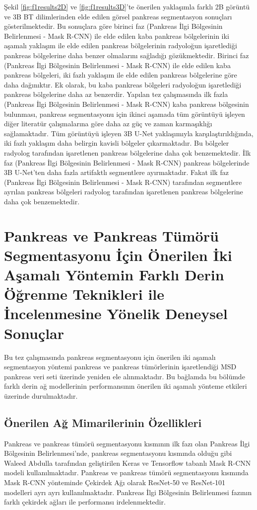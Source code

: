 Şekil \ref{fig:f1results2D} ve \ref{fig:f1results3D}’te önerilen yaklaşımla farklı 2B görüntü ve 3B BT dilimlerinden elde edilen görsel pankreas segmentasyon sonuçları gösterilmektedir. Bu sonuçlara göre birinci faz (Pankreas İlgi Bölgesinin Belirlenmesi - Mask R-CNN) ile elde edilen kaba pankreas bölgelerinin iki aşamalı yaklaşım ile elde edilen pankreas bölgelerinin radyoloğun işaretlediği pankreas bölgelerine daha benzer olmalarını sağladığı gözükmektedir. Birinci faz (Pankreas İlgi Bölgesinin Belirlenmesi - Mask R-CNN) ile elde edilen kaba pankreas bölgeleri, iki fazlı yaklaşım ile elde edilen pankreas bölgelerine göre daha dağınıktır. Ek olarak, bu kaba pankreas bölgeleri radyoloğun işaretlediği pankreas bölgelerine daha az benzerdir. Yapılan tez çalışmasında ilk fazla (Pankreas İlgi Bölgesinin Belirlenmesi - Mask R-CNN) kaba pankreas bölgesinin bulunması, pankreas segmentasyonu için ikinci aşamada tüm görüntüyü işleyen diğer literatür çalışmalarına göre daha az güç ve zaman karmaşıklığı sağlamaktadır. Tüm görüntüyü işleyen 3B U-Net yaklaşımıyla karşılaştırıldığında, iki fazlı yaklaşım daha belirgin kavisli bölgeler çıkarmaktadır. Bu bölgeler radyolog tarafından işaretlenen pankreas bölgelerine daha çok benzemektedir. İlk faz (Pankreas İlgi Bölgesinin Belirlenmesi -  Mask R-CNN) pankreas bölgelerinde 3B U-Net'ten daha fazla artifaktlı segmentlere ayırmaktadır. Fakat ilk faz (Pankreas İlgi Bölgesinin Belirlenmesi - Mask R-CNN) tarafından segmentlere ayrılan pankreas bölgeleri radyolog tarafından işaretlenen pankreas bölgelerine daha çok benzemektedir.

\section{Pankreas ve Pankreas Tümörü Segmentasyonu İçin Önerilen İki Aşamalı Yöntemin Farklı Derin Öğrenme Teknikleri ile İncelenmesine Yönelik Deneysel Sonuçlar}

Bu tez çalışmasında pankreas segmentasyonu için önerilen iki aşamalı segmentasyon yöntemi pankreas ve pankreas tümörlerinin işaretlendiği MSD pankreas veri seti üzerinde yeniden ele alınmaktadır. Bu bağlamda bu bölümde farklı derin ağ modellerinin performansının önerilen iki aşamalı yönteme etkileri üzerinde durulmaktadır.

\subsection{Önerilen Ağ Mimarilerinin Özellikleri}
Pankreas ve pankreas tümörü segmentasyonu kısmının ilk fazı olan Pankreas İlgi Bölgesinin Belirlenmesi’nde, pankreas segmentasyonu kısmında olduğu gibi Waleed Abdulla tarafından geliştirilen Keras ve Tensorflow tabanlı Mask R-CNN modeli \cite{he2017mask} kullanılmaktadır. Pankreas ve pankreas tümörü segmentasyonu kısmında Mask R-CNN yönteminde Çekirdek Ağı olarak ResNet-50 ve ResNet-101 modelleri ayrı ayrı kullanılmaktadır. Pankreas İlgi Bölgesinin Belirlenmesi fazının farklı çekirdek ağları ile performansı irdelenmektedir. 

